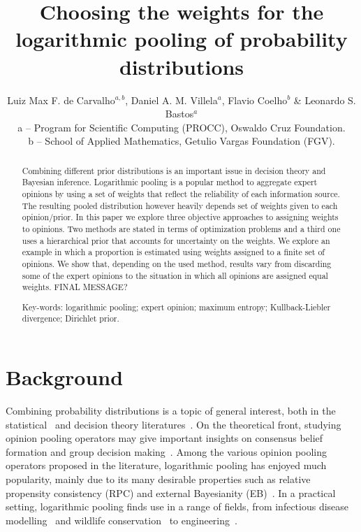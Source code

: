 \documentclass[a4paper, notitlepage, 10pt]{article}
\title{\vspace{-9ex}\centering \bf Choosing the weights for the logarithmic pooling of probability distributions}
\author{
Luiz Max F. de Carvalho$^{a,b}$, Daniel A. M. Villela$^a$, Flavio Coelho$^b$ \& Leonardo S. Bastos$^a$ \\
a -- Program for Scientific Computing (PROCC), Oswaldo Cruz Foundation. \\
b -- School of Applied Mathematics, Getulio Vargas Foundation (FGV).
}
\begin{document}
\maketitle

\begin{abstract}
Combining different prior distributions is an important issue in decision theory and Bayesian inference.
Logarithmic pooling is a popular method to aggregate expert opinions by using a set of weights that reflect the reliability of each information source.
The resulting pooled distribution however heavily depends set of weights given to each opinion/prior.
In this paper we explore three objective approaches to assigning weights to opinions. Two methods are stated in terms of optimization problems and a third one uses a hierarchical prior that accounts for uncertainty on the weights. 
We explore an example in which a proportion is estimated using weights assigned to a finite set of opinions.
We show that, depending on the used method, results vary from discarding some of the expert opinions to the situation in which all opinions are assigned equal weights.
FINAL MESSAGE?

Key-words: logarithmic pooling; expert opinion; maximum entropy; Kullback-Liebler divergence; Dirichlet prior. 
\end{abstract}

\section*{Background}

Combining probability distributions is a topic of general interest, both in the statistical~\citep{genest1986A,genest1986B} and decision theory literatures~\citep{genest1984}.
On the theoretical front, studying opinion pooling operators may give important insights on consensus belief formation and group decision making~\citep{genest1986B}.
Among the various opinion pooling operators proposed in the literature, logarithmic pooling has enjoyed much popularity, mainly due to its many desirable properties such as relative propensity consistency (RPC) and external Bayesianity (EB)~\citep{genest1986A}. 
In a practical setting, logarithmic pooling finds use in a range of fields, from infectious disease modelling~\citep{Coelho2009} and wildlife conservation~\citep{poole2000} to engineering~\citep{lind1988, savchuk1994}.
\end{document}
